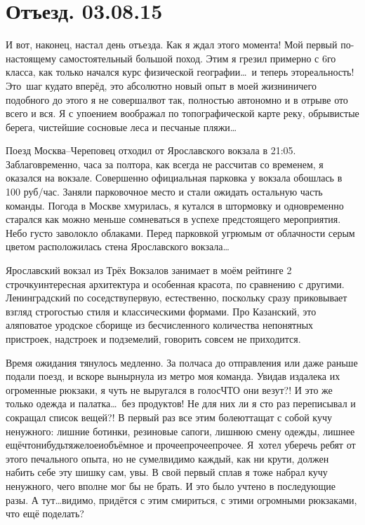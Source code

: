 \chapter{Отъезд. 03.08.15}

И вот, наконец, настал день отъезда. Как я ждал этого момента! Мой первый по-настоящему самостоятельный большой поход. Этим я грезил примерно с 6\sdash го класса, как только начался курс физической географии\ldots~и теперь это\mdash реальность! Это~шаг куда\sdash то вперёд, это абсолютно новый опыт в моей жизни\mdash ничего подобного до этого я не совершал\mdash вот так, полностью автономно и в отрыве ото всего и вся. Я с упоением воображал по топографической карте реку, обрывистые берега, чистейшие сосновые леса и песчаные пляжи\ldots 

Поезд Москва\nobreakdash--Череповец отходил от Ярославского вокзала в 21:05. Заблаговременно, часа за полтора, как всегда не рассчитав со временем, я оказался на вокзале. Совершенно официальная парковка у вокзала обошлась в 100 руб/час. Заняли парковочное место и стали ожидать остальную часть команды. Погода в Москве хмурилась, я кутался в штормовку и одновременно старался как можно меньше сомневаться в успехе предстоящего мероприятия. Небо густо заволокло облаками. Перед парковкой угрюмым от облачности серым цветом расположилась стена Ярославского вокзала\ldots

Ярославский вокзал из Трёх Вокзалов занимает в моём рейтинге 2 строчку\mdash интересная архитектура и особенная красота, по сравнению с другими. Ленинградский по соседству\mdash первую, естественно, поскольку сразу приковывает взгляд строгостью стиля и классическими формами. Про Казанский, это аляповатое уродское сборище из бесчисленного количества непонятных пристроек, надстроек и подземелий, говорить совсем не приходится.

Время ожидания тянулось медленно. За полчаса до отправления или даже раньше подали поезд, и вскоре вынырнула из метро моя команда. Увидав издалека их огроменные рюкзаки, я чуть не выругался в голос\mdash ЧТО они везут?! И это же только одежда и палатка\ldots~без продуктов! Не для них ли я сто раз переписывал и сокращал список вещей?! В первый раз все этим болеют\mdash тащат с собой кучу ненужного: лишние ботинки, резиновые сапоги, лишнюю смену одежды, лишнее ещё\sdash что\sdash нибудь\sdash тяжелое\sdash и\sdash объёмное и прочее\sdash прочее\sdash прочее. Я~хотел уберечь ребят от этого печального опыта, но не сумел\mdash видимо каждый, как ни крути, должен набить себе эту шишку сам, увы. В свой первый сплав я тоже набрал кучу ненужного, чего вполне мог бы не брать. И это было учтено в последующие разы. А тут\ldots видимо, придётся с этим смириться, с этими огромными рюкзаками, что ещё поделать?

